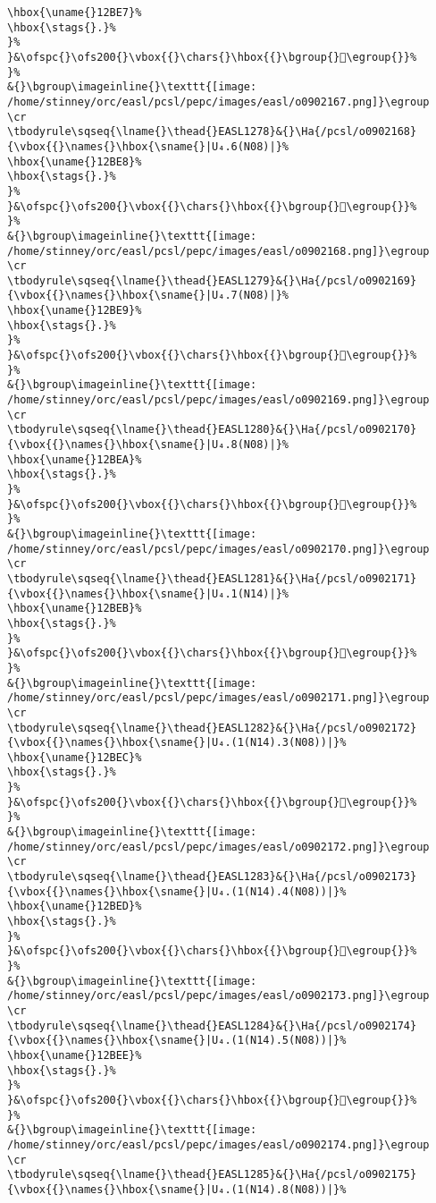 \begin{verbatim}
\hbox{\uname{}12BE7}%
\hbox{\stags{}.}%
}%
}&\ofspc{}\ofs200{}\vbox{{}\chars{}\hbox{{}\bgroup{}𒯧\egroup{}}%
}%
&{}\bgroup\imageinline{}\texttt{[image: /home/stinney/orc/easl/pcsl/pepc/images/easl/o0902167.png]}\egroup
\cr
\tbodyrule\sqseq{\lname{}\thead{}EASL1278}&{}\Ha{/pcsl/o0902168}{\vbox{{}\names{}\hbox{\sname{}|U₄.6(N08)|}%
\hbox{\uname{}12BE8}%
\hbox{\stags{}.}%
}%
}&\ofspc{}\ofs200{}\vbox{{}\chars{}\hbox{{}\bgroup{}𒯨\egroup{}}%
}%
&{}\bgroup\imageinline{}\texttt{[image: /home/stinney/orc/easl/pcsl/pepc/images/easl/o0902168.png]}\egroup
\cr
\tbodyrule\sqseq{\lname{}\thead{}EASL1279}&{}\Ha{/pcsl/o0902169}{\vbox{{}\names{}\hbox{\sname{}|U₄.7(N08)|}%
\hbox{\uname{}12BE9}%
\hbox{\stags{}.}%
}%
}&\ofspc{}\ofs200{}\vbox{{}\chars{}\hbox{{}\bgroup{}𒯩\egroup{}}%
}%
&{}\bgroup\imageinline{}\texttt{[image: /home/stinney/orc/easl/pcsl/pepc/images/easl/o0902169.png]}\egroup
\cr
\tbodyrule\sqseq{\lname{}\thead{}EASL1280}&{}\Ha{/pcsl/o0902170}{\vbox{{}\names{}\hbox{\sname{}|U₄.8(N08)|}%
\hbox{\uname{}12BEA}%
\hbox{\stags{}.}%
}%
}&\ofspc{}\ofs200{}\vbox{{}\chars{}\hbox{{}\bgroup{}𒯪\egroup{}}%
}%
&{}\bgroup\imageinline{}\texttt{[image: /home/stinney/orc/easl/pcsl/pepc/images/easl/o0902170.png]}\egroup
\cr
\tbodyrule\sqseq{\lname{}\thead{}EASL1281}&{}\Ha{/pcsl/o0902171}{\vbox{{}\names{}\hbox{\sname{}|U₄.1(N14)|}%
\hbox{\uname{}12BEB}%
\hbox{\stags{}.}%
}%
}&\ofspc{}\ofs200{}\vbox{{}\chars{}\hbox{{}\bgroup{}𒯫\egroup{}}%
}%
&{}\bgroup\imageinline{}\texttt{[image: /home/stinney/orc/easl/pcsl/pepc/images/easl/o0902171.png]}\egroup
\cr
\tbodyrule\sqseq{\lname{}\thead{}EASL1282}&{}\Ha{/pcsl/o0902172}{\vbox{{}\names{}\hbox{\sname{}|U₄.(1(N14).3(N08))|}%
\hbox{\uname{}12BEC}%
\hbox{\stags{}.}%
}%
}&\ofspc{}\ofs200{}\vbox{{}\chars{}\hbox{{}\bgroup{}𒯬\egroup{}}%
}%
&{}\bgroup\imageinline{}\texttt{[image: /home/stinney/orc/easl/pcsl/pepc/images/easl/o0902172.png]}\egroup
\cr
\tbodyrule\sqseq{\lname{}\thead{}EASL1283}&{}\Ha{/pcsl/o0902173}{\vbox{{}\names{}\hbox{\sname{}|U₄.(1(N14).4(N08))|}%
\hbox{\uname{}12BED}%
\hbox{\stags{}.}%
}%
}&\ofspc{}\ofs200{}\vbox{{}\chars{}\hbox{{}\bgroup{}𒯭\egroup{}}%
}%
&{}\bgroup\imageinline{}\texttt{[image: /home/stinney/orc/easl/pcsl/pepc/images/easl/o0902173.png]}\egroup
\cr
\tbodyrule\sqseq{\lname{}\thead{}EASL1284}&{}\Ha{/pcsl/o0902174}{\vbox{{}\names{}\hbox{\sname{}|U₄.(1(N14).5(N08))|}%
\hbox{\uname{}12BEE}%
\hbox{\stags{}.}%
}%
}&\ofspc{}\ofs200{}\vbox{{}\chars{}\hbox{{}\bgroup{}𒯮\egroup{}}%
}%
&{}\bgroup\imageinline{}\texttt{[image: /home/stinney/orc/easl/pcsl/pepc/images/easl/o0902174.png]}\egroup
\cr
\tbodyrule\sqseq{\lname{}\thead{}EASL1285}&{}\Ha{/pcsl/o0902175}{\vbox{{}\names{}\hbox{\sname{}|U₄.(1(N14).8(N08))|}%

\end{verbatim}
